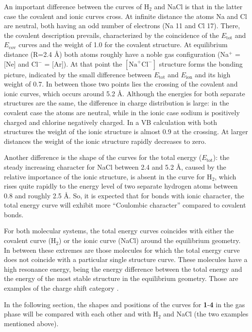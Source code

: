 An important difference between the curves of H$_2$ and NaCl is that in the latter case the covalent and ionic curves cross. At infinite distance the atoms Na and Cl are neutral, both having an odd number of electrons (Na 11 and Cl 17). There, the covalent description prevails, characterized by the coincidence of the $E_\mathrm{tot}$ and $E_\mathrm{cov}$ curves and the weight of 1.0 for the covalent structure. At equilibrium distance (R=2.4 \AA) both atoms roughly have a noble gas configuration (Na$^{+}$ = [Ne] and Cl$^{-}$ = [Ar]). At that point the $[\mathrm{Na}^{+}\mathrm{Cl}^{-}]$ structure forms the bonding picture, indicated by the small difference between $E_\mathrm{tot}$ and $E_\mathrm{ion}$ and its high weight of 0.7. In between those two points lies the crossing of the covalent and ionic curves, which occurs around 5.2 \AA. Although the energies for both separate structures are the same, the difference in charge distribution is large: in the covalent case the atoms are neutral, while in the ionic case sodium is positively charged and chlorine negatively charged. In a VB calculation with both structures the weight of the ionic structure is almost 0.9 at the crossing. At larger distances the weight of the ionic structure rapidly decreases to zero.

Another difference is the shape of the curves for the total energy ($E_\mathrm{tot}$): the steady increasing character for NaCl between 2.4 and 5.2 \AA, caused by the relative importance of the ionic structure, is absent in the curve for H$_2$, which rises quite rapidly to the energy level of two separate hydrogen atoms between 0.8 and roughly 2.5 \AA. So, it is expected that for bonds with ionic character, the total energy curve will exhibit more ``Coulombic character'' compared to covalent bonds. 

For both molecular systems, the total energy curves coincides with either the covalent curve (H$_2$) or the ionic curve (NaCl) around the equilibrium geometry. In between these extremes are those molecules for which the total energy curve does not coincide with a particular single structure curve. These molecules have a high resonance energy, being the energy difference between the total energy and the energy of the most stable structure in the equilibrium geometry. Those are examples of the charge shift category \cite{cs1,cs2}.

In the following section, the shapes and positions of the curves for \textbf{1}-\textbf{4} in the gas phase will be compared with each other and with H$_2$ and NaCl (the two examples mentioned above).

